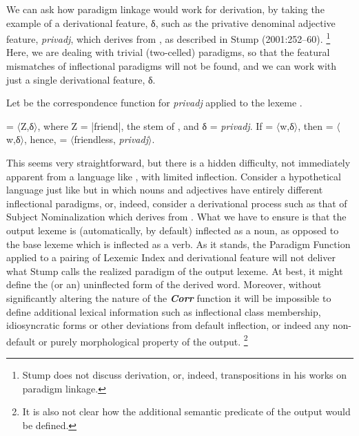 \documentclass[output=paper,
modfonts
]{LSP/langsci}
\begin{document}
We can ask how  paradigm linkage would work for derivation, by taking the example of a derivational feature, δ, such as the privative denominal adjective feature, \textit{privadj}, which derives  from , as described in Stump (2001:252--60).%
\footnote{Stump does not discuss derivation, or, indeed, transpositions in his works on paradigm linkage.} %
Here, we are  dealing with trivial (two-celled) paradigms, so that the featural mismatches of inflectional paradigms will not be found, and we can work with just a single derivational feature, δ. 

\begin{exe} \ex \label{friendless}

Let  be the correspondence function for \textit{privadj} applied to the lexeme . 

 = $\langle$Z,δ$\rangle$, where Z = |friend|, the stem of , and δ = \textit{privadj}.  If  = $\langle$w,δ$\rangle$, then  = $\langle$w,δ$\rangle$, hence,  = $\langle$friendless, \textit{privadj}$\rangle$. 
\end{exe}
This seems very straightforward, but there is a hidden difficulty, not immediately apparent from a language like , with limited inflection. Consider a hypothetical language just like  but in which nouns and adjectives have entirely different inflectional paradigms, or, indeed, consider a derivational process such as that of Subject Nominalization which derives  from . What we have to ensure is that the output lexeme is (automatically, by default) inflected as a noun, as opposed to the base lexeme which is inflected as a verb. As it stands, the Paradigm Function applied to a pairing of Lexemic Index and derivational feature will not deliver what Stump calls the realized paradigm of the output lexeme. At best, it might define the (or an) uninflected  form of the derived word. Moreover, without significantly altering the nature of the \textbf{\textit{Corr}} function it will be impossible to define additional lexical information such as inflectional class membership, idiosyncratic  forms or other deviations from default inflection, or indeed any non-default or purely morphological property of the output.%
\footnote{It is also not clear how the additional semantic predicate of the output would be defined.}%
\end{document}
